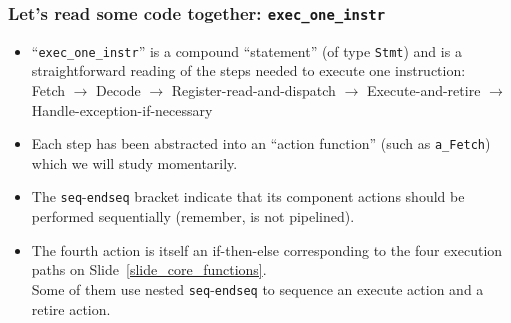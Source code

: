 
\begin{frame}[fragile]
\frametitle{Let's read some code together: {\tt exec\_one\_instr}}

\begin{center}\scriptsize


 \vspace*{5ex}

 \begin{minipage}{0.8\textwidth}
  \begin{itemize}

   \item ``{\tt exec\_one\_instr}'' is a compound ``statement'' (of type {\tt Stmt}) and is
   a straightforward reading of the steps needed to execute one
   instruction: \\
   \hm Fetch $\rightarrow$ Decode $\rightarrow$ Register-read-and-dispatch
       $\rightarrow$ Execute-and-retire $\rightarrow$ Handle-exception-if-necessary

   \vspace*{1ex}

   \item Each step has been abstracted into an ``action function''
     (such as {\tt a\_Fetch}) which we will study momentarily.

   \vspace*{1ex}

   \item The {\tt seq}-{\tt endseq} bracket indicate that its
     component actions should be performed sequentially (remember,
     {\DRUM} is not pipelined).

   \vspace*{1ex}

   \item The fourth action is itself an if-then-else corresponding to
     the four execution paths on Slide~\ref{slide_core_functions}.
     \\ Some of them use nested {\tt seq}-{\tt endseq} to sequence an
     execute action and a retire action.

  \end{itemize}

 \end{minipage}
\end{center}

\end{frame}

